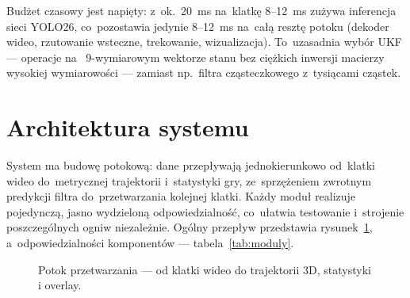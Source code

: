 \documentclass[14pt,a4paper]{extarticle}
\begin{document}
\noindent Budżet czasowy jest napięty: z~ok.~20~ms na~klatkę 8--12~ms zużywa inferencja
sieci YOLO26, co~pozostawia jedynie 8--12~ms na~całą resztę potoku (dekoder wideo,
rzutowanie wsteczne, trekowanie, wizualizacja). To~uzasadnia wybór UKF — operacje na~
9-wymiarowym wektorze stanu bez ciężkich inwersji macierzy wysokiej wymiarowości — zamiast
np.~filtra cząsteczkowego z~tysiącami cząstek.

\section{Architektura systemu}

System ma budowę potokową: dane przepływają jednokierunkowo od~klatki wideo do~metrycznej
trajektorii i~statystyki gry, ze~sprzężeniem zwrotnym predykcji filtra do~przetwarzania
kolejnej klatki. Każdy moduł realizuje pojedynczą, jasno wydzieloną odpowiedzialność,
co~ułatwia testowanie i~strojenie poszczególnych ogniw niezależnie. Ogólny przepływ
przedstawia rysunek~\ref{fig:pipeline}, a~odpowiedzialności komponentów — tabela~\ref{tab:moduly}.

\begin{figure}[H]
\centering
{}
\caption{Potok przetwarzania — od klatki wideo do trajektorii 3D, statystyki i overlay.}
\label{fig:pipeline}
\end{figure}
\end{document}
